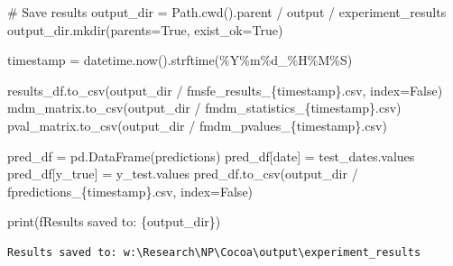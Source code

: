 \documentclass[
  letterpaper,
  DIV=11,
  numbers=noendperiod]{scrartcl}
\newenvironment{Shaded}{\begin{snugshade}}{\end{snugshade}}
\newcommand{\BuiltInTok}[1]{\textcolor[rgb]{0.00,0.23,0.31}{#1}}
\newcommand{\CommentTok}[1]{\textcolor[rgb]{0.37,0.37,0.37}{#1}}
\newcommand{\NormalTok}[1]{\textcolor[rgb]{0.00,0.23,0.31}{#1}}
\newcommand{\OperatorTok}[1]{\textcolor[rgb]{0.37,0.37,0.37}{#1}}
\newcommand{\SpecialCharTok}[1]{\textcolor[rgb]{0.37,0.37,0.37}{#1}}
\newcommand{\SpecialStringTok}[1]{\textcolor[rgb]{0.13,0.47,0.30}{#1}}
\newcommand{\StringTok}[1]{\textcolor[rgb]{0.13,0.47,0.30}{#1}}
\newcommand{\VariableTok}[1]{\textcolor[rgb]{0.07,0.07,0.07}{#1}}
\begin{document}
\begin{Shaded}
\begin{Highlighting}[]
\CommentTok{\# Save results}
\NormalTok{output\_dir }\OperatorTok{=}\NormalTok{ Path.cwd().parent }\OperatorTok{/} \StringTok{\textquotesingle{}output\textquotesingle{}} \OperatorTok{/} \StringTok{\textquotesingle{}experiment\_results\textquotesingle{}}
\NormalTok{output\_dir.mkdir(parents}\OperatorTok{=}\VariableTok{True}\NormalTok{, exist\_ok}\OperatorTok{=}\VariableTok{True}\NormalTok{)}

\NormalTok{timestamp }\OperatorTok{=}\NormalTok{ datetime.now().strftime(}\StringTok{\textquotesingle{}\%Y\%m}\SpecialCharTok{\%d}\StringTok{\_\%H\%M\%S\textquotesingle{}}\NormalTok{)}

\NormalTok{results\_df.to\_csv(output\_dir }\OperatorTok{/} \SpecialStringTok{f\textquotesingle{}msfe\_results\_}\SpecialCharTok{\{}\NormalTok{timestamp}\SpecialCharTok{\}}\SpecialStringTok{.csv\textquotesingle{}}\NormalTok{, index}\OperatorTok{=}\VariableTok{False}\NormalTok{)}
\NormalTok{mdm\_matrix.to\_csv(output\_dir }\OperatorTok{/} \SpecialStringTok{f\textquotesingle{}mdm\_statistics\_}\SpecialCharTok{\{}\NormalTok{timestamp}\SpecialCharTok{\}}\SpecialStringTok{.csv\textquotesingle{}}\NormalTok{)}
\NormalTok{pval\_matrix.to\_csv(output\_dir }\OperatorTok{/} \SpecialStringTok{f\textquotesingle{}mdm\_pvalues\_}\SpecialCharTok{\{}\NormalTok{timestamp}\SpecialCharTok{\}}\SpecialStringTok{.csv\textquotesingle{}}\NormalTok{)}

\NormalTok{pred\_df }\OperatorTok{=}\NormalTok{ pd.DataFrame(predictions)}
\NormalTok{pred\_df[}\StringTok{\textquotesingle{}date\textquotesingle{}}\NormalTok{] }\OperatorTok{=}\NormalTok{ test\_dates.values}
\NormalTok{pred\_df[}\StringTok{\textquotesingle{}y\_true\textquotesingle{}}\NormalTok{] }\OperatorTok{=}\NormalTok{ y\_test.values}
\NormalTok{pred\_df.to\_csv(output\_dir }\OperatorTok{/} \SpecialStringTok{f\textquotesingle{}predictions\_}\SpecialCharTok{\{}\NormalTok{timestamp}\SpecialCharTok{\}}\SpecialStringTok{.csv\textquotesingle{}}\NormalTok{, index}\OperatorTok{=}\VariableTok{False}\NormalTok{)}

\BuiltInTok{print}\NormalTok{(}\SpecialStringTok{f\textquotesingle{}Results saved to: }\SpecialCharTok{\{}\NormalTok{output\_dir}\SpecialCharTok{\}}\SpecialStringTok{\textquotesingle{}}\NormalTok{)}
\end{Highlighting}
\end{Shaded}

\begin{verbatim}
Results saved to: w:\Research\NP\Cocoa\output\experiment_results
\end{verbatim}
\end{document}
